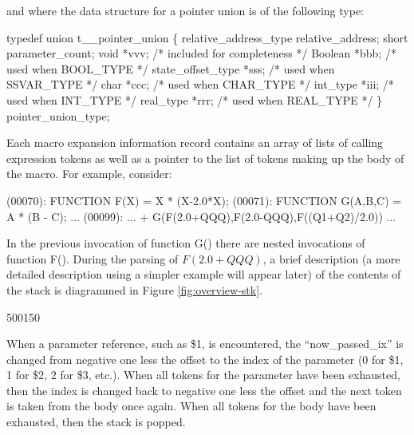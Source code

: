 and where the data structure for a pointer union is of the following type:
\begin{codeexample}
typedef union t__pointer_union
   \{
     relative_address_type relative_address;
     short parameter_count;
     void *vvv;               /* included for completeness */
     Boolean *bbb;            /* used when BOOL_TYPE */
     state_offset_type *sss;  /* used when SSVAR_TYPE */
     char *ccc;               /* used when CHAR_TYPE */
     int_type *iii;           /* used when INT_TYPE */
     real_type *rrr;          /* used when REAL_TYPE */
   \} pointer_union_type;
\end{codeexample}



Each macro expansion information record contains an
array of lists of calling expression tokens as well as a pointer
to the list of tokens making up the body of the macro.  For example,
consider:
\begin{codeexample}
(00070): FUNCTION F(X) = X * (X-2.0*X);\label{xmp:expansion-stack}
(00071): FUNCTION G(A,B,C) = A * (B - C);
         ...
(00099): ...  + G(F(2.0+QQQ),F(2.0-QQQ),F((Q1+Q2)/2.0)) ...
\end{codeexample}

In the previous invocation of function G() there are nested invocations of
function F().   During the parsing of $F(2.0+QQQ)$, a brief description
(a more detailed description using a simpler example will appear later)
of the contents of the stack is diagrammed in Figure \ref{fig:overview-stk}.

\startfig
\begin{fast_picture}{500}{150}
\savFboxpos
\nextFbox{}
         \valbox{}
                 \stackBboxtoright
                 \nextBbox{}
\nextFbox{}
         \valbox{}
                 \stackBboxtoright
                 \nextBbox{}
                 \nextBbox{}
                 \nextBbox{}
\end{fast_picture}

When a parameter reference, such as \$1, is
encountered, the ``now\_passed\_ix''
is changed from negative one less the offset to the index
of the parameter (0 for \$1, 1 for
\$2, 2 for \$3, etc.).   When all tokens for the parameter have been
exhausted, then the index is changed back to negative one less the offset
and the next token
is taken from the body once again.   When all tokens for the body have
been exhausted, then the stack is popped.

